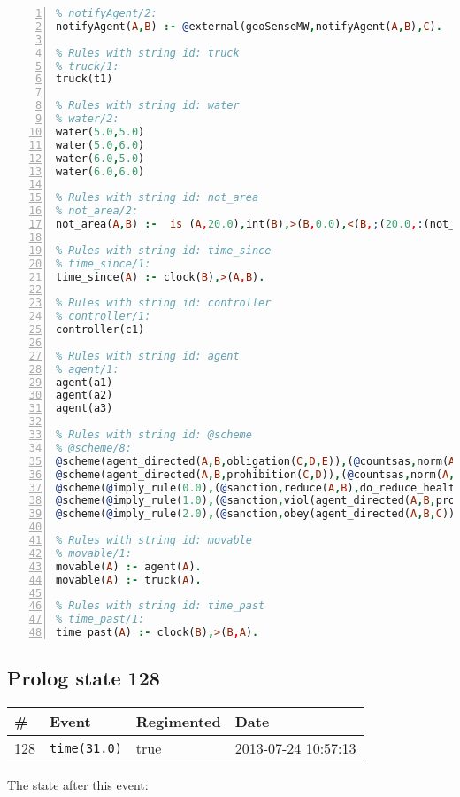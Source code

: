 \documentclass[11pt]{article}\usepackage[utf8]{inputenc}\usepackage{geometry}
\begin{document}
\begin{lstlisting}[language=Prolog, numbers=left]
% Rules with string id: notifyAgent
% notifyAgent/2:
notifyAgent(A,B) :- @external(geoSenseMW,notifyAgent(A,B),C).

% Rules with string id: truck
% truck/1:
truck(t1)

% Rules with string id: water
% water/2:
water(5.0,5.0)
water(5.0,6.0)
water(6.0,5.0)
water(6.0,6.0)

% Rules with string id: not_area
% not_area/2:
not_area(A,B) :-  is (A,20.0),int(B),>(B,0.0),<(B,;(20.0,:(not_area(A,B), is (-(B),20.0)))),int(A),>(A,0.0),<(A,;(20.0,:(area(A,B),-(int(A))))),int(B),>(A,0.0),>(B,0.0),<(A,21.0),<(B,21.0).

% Rules with string id: time_since
% time_since/1:
time_since(A) :- clock(B),>(A,B).

% Rules with string id: controller
% controller/1:
controller(c1)

% Rules with string id: agent
% agent/1:
agent(a1)
agent(a2)
agent(a3)

% Rules with string id: @scheme
% @scheme/8:
@scheme(agent_directed(A,B,obligation(C,D,E)),(@countsas,norm(A,B,F,obligation(C,D,E)),F),false,(listTrue(C)),(time_past(D)),false,[plus(viol(agent_directed(A,B,obligation(C,D,E))))|[]],[plus(obey(agent_directed(A,B,obligation(C,D,E))))|[]])
@scheme(agent_directed(A,B,prohibition(C,D)),(@countsas,norm(A,B,E,prohibition(C,D)),E),(listTrue(C)),false,(false),false,[plus(viol(agent_directed(A,B,prohibition(C,D))))|[]],[plus(obey(agent_directed(A,B,prohibition(C,D))))|[]])
@scheme(@imply_rule(0.0),(@sanction,reduce(A,B),do_reduce_health(A,B),notifyAgent(A,changed(status))),true,false,false,false,[min(reduce(A,B))|[]],[])
@scheme(@imply_rule(1.0),(@sanction,viol(agent_directed(A,B,prohibition(C,D))),do_sanction(D)),true,false,false,false,[min(viol(agent_directed(A,B,prohibition(C,D))))|[]],[])
@scheme(@imply_rule(2.0),(@sanction,obey(agent_directed(A,B,C))),true,false,false,false,[min(obey(agent_directed(A,B,C)))|[]],[])

% Rules with string id: movable
% movable/1:
movable(A) :- agent(A).
movable(A) :- truck(A).

% Rules with string id: time_past
% time_past/1:
time_past(A) :- clock(B),>(B,A).

\end{lstlisting}
\clearpage 
\subsection{Prolog state 128}
\begin{table}[ht]
\centering 
\begin{tabular}{l l l l} 
\textbf{\#} & \textbf{Event} & \textbf{Regimented} & \textbf{Date} \\ [0.5ex] 
\hline
128&\texttt{time(31.0)}&true&2013-07-24 10:57:13\\ [1ex] \hline\end{tabular}
\end{table}
The state after this event:
\end{document}
